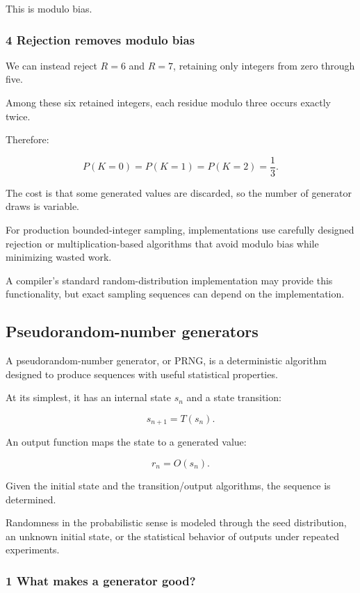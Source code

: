 This is modulo bias.

\subsubsection{4 Rejection removes modulo bias}\label{02-foundations-ii-ch029-rejection-removes-modulo-bias}

We can instead reject \(R=6\) and \(R=7\), retaining only integers from zero through five.

Among these six retained integers, each residue modulo three occurs exactly twice.

Therefore:

\[
 P(K=0)=P(K=1)=P(K=2)=\frac13.
\]

The cost is that some generated values are discarded, so the number of generator draws is variable.

For production bounded-integer sampling, implementations use carefully designed rejection or multiplication-based algorithms that avoid modulo bias while minimizing wasted work.

A compiler's standard random-distribution implementation may provide this functionality, but exact sampling sequences can depend on the implementation.

\subsection{Pseudorandom-number generators}\label{02-foundations-ii-ch029-pseudorandom-number-generators}

A pseudorandom-number generator, or PRNG, is a deterministic algorithm designed to produce sequences with useful statistical properties.

At its simplest, it has an internal state \(s_n\) and a state transition:

\[
 \boxed{s_{n+1}=T(s_n)}.
\]

An output function maps the state to a generated value:

\[
 \boxed{r_n=O(s_n)}.
\]

Given the initial state and the transition/output algorithms, the sequence is determined.

Randomness in the probabilistic sense is modeled through the seed distribution, an unknown initial state, or the statistical behavior of outputs under repeated experiments.

\subsubsection{1 What makes a generator good?}\label{02-foundations-ii-ch029-what-makes-a-generator-good}

